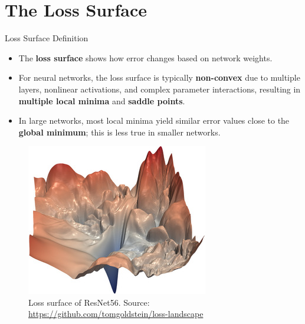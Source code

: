 \documentclass[serif, aspectratio=169]{beamer}
\begin{document}
\section{The Loss Surface}

\begin{frame}{Loss Surface Definition}
    \begin{itemize}
        \item The \textbf{loss surface} shows how error changes based on network weights.
        \item For neural networks, the loss surface is typically \textbf{non-convex} due to multiple layers, nonlinear activations, and complex parameter interactions, resulting in \textbf{multiple local minima} and \textbf{saddle points}.
        \item In large networks, most local minima yield similar error values close to the \textbf{global minimum}; this is less true in smaller networks.
    \end{itemize}
    \begin{figure}[h]
        \centering
        \includegraphics[height=0.4\textheight]{pic/resnet56_noshort_small.jpg}
        \caption{\footnotesize Loss surface of ResNet56. Source: \url{https://github.com/tomgoldstein/loss-landscape}}
    \end{figure}
\end{frame}
\end{document}

